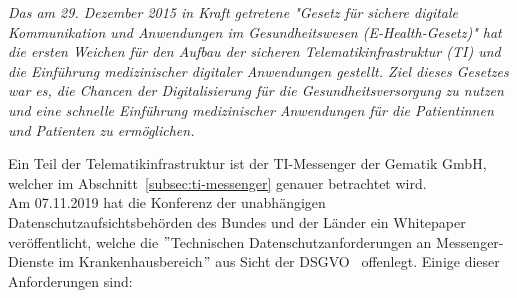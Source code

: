     \textit{Das am 29. Dezember 2015 in Kraft getretene "Gesetz für sichere digitale Kommunikation und Anwendungen im Gesundheitswesen (E-Health-Gesetz)" hat die ersten Weichen für den Aufbau der sicheren Telematikinfrastruktur (TI) und die Einführung medizinischer digitaler Anwendungen gestellt.
    Ziel dieses Gesetzes war es, die Chancen der Digitalisierung für die Gesundheitsversorgung zu nutzen und eine schnelle Einführung medizinischer Anwendungen für die Patientinnen und Patienten zu ermöglichen.}~\cite{ehealthgesetz}

    Ein Teil der Telematikinfrastruktur ist der TI-Messenger der Gematik GmbH, welcher im Abschnitt~\ref{subsec:ti-messenger} genauer betrachtet wird.\\
    Am 07.11.2019 hat die Konferenz der unabhängigen Datenschutzaufsichtsbehörden des Bundes und der Länder ein Whitepaper veröffentlicht, welche die \("\)Technischen Datenschutzanforderungen an Messenger-Dienste im\linebreak
    Krankenhausbereich\("\) aus Sicht der DSGVO~\cite{datenschutzkonferenz} offenlegt.
    Einige dieser Anforderungen sind:
